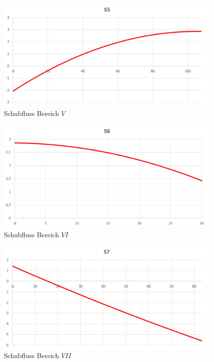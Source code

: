 \begin{figure}
	\includegraphics[width=1.0\textwidth]{Bilder/S5.png}
	\caption{Schubfluss Bereich $V$}
	\label{fig:S5}
\end{figure}
\begin{figure}
	\includegraphics[width=1.0\textwidth]{Bilder/S6.png}
	\caption{Schubfluss Bereich $VI$}
	\label{fig:S6}
\end{figure}
\begin{figure}
	\includegraphics[width=1.0\textwidth]{Bilder/S7.png}
	\caption{Schubfluss Bereich $VII$}
	\label{fig:S7}
\end{figure}
